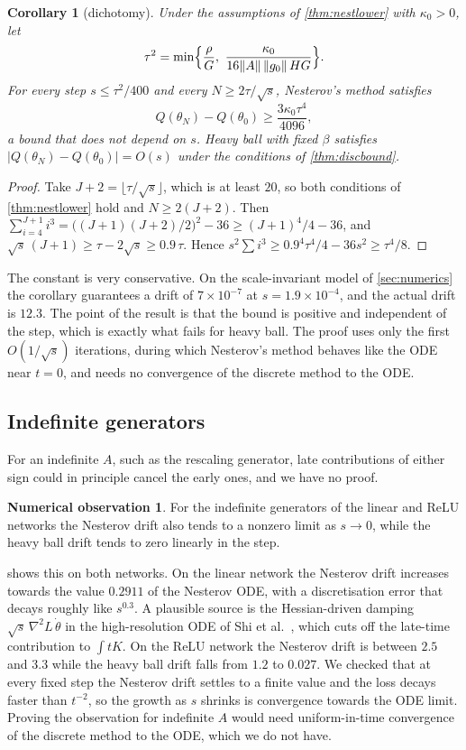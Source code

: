 \documentclass[11pt]{article}
\newtheorem{corollary}[theorem]{Corollary}
\theoremstyle{remark}
\theoremstyle{definition}
\newtheorem{observation}[theorem]{Numerical observation}
\begin{document}
\begin{corollary}[dichotomy]\label{cor:dichotomy}
Under the assumptions of \cref{thm:nestlower} with $\kappa_0>0$, let
\[
\tau^2=\min\Bigl\{\frac\rho G,\ \frac{\kappa_0}{16\|A\|\,\|g_0\|\,HG}\Bigr\}.
\]
For every step $s\le\tau^2/400$ and every $N\ge2\tau/\sqrt s$, Nesterov's method satisfies
\[
Q(\theta_N)-Q(\theta_0)\ge\frac{3\kappa_0\tau^4}{4096},
\]
a bound that does not depend on $s$. Heavy ball with fixed $\beta$ satisfies $|Q(\theta_N)-Q(\theta_0)|=O(s)$ under the conditions of \cref{thm:discbound}.
\end{corollary}

\begin{proof}
Take $J+2=\lfloor\tau/\sqrt s\rfloor$, which is at least $20$, so both conditions of \cref{thm:nestlower} hold and $N\ge2(J+2)$. Then $\sum_{i=4}^{J+1}i^3=\bigl((J+1)(J+2)/2\bigr)^2-36\ge(J+1)^4/4-36$, and $\sqrt s\,(J+1)\ge\tau-2\sqrt s\ge0.9\,\tau$. Hence $s^2\sum i^3\ge0.9^4\tau^4/4-36s^2\ge\tau^4/8$.
\end{proof}

The constant is very conservative. On the scale-invariant model of \cref{sec:numerics} the corollary guarantees a drift of $7\times10^{-7}$ at $s=1.9\times10^{-4}$, and the actual drift is $12.3$. The point of the result is that the bound is positive and independent of the step, which is exactly what fails for heavy ball. The proof uses only the first $O(1/\sqrt s)$ iterations, during which Nesterov's method behaves like the ODE near $t=0$, and needs no convergence of the discrete method to the ODE.

\subsection{Indefinite generators}

For an indefinite $A$, such as the rescaling generator, late contributions of either sign could in principle cancel the early ones, and we have no proof.

\begin{observation}\label{obs:dichotomy}
For the indefinite generators of the linear and ReLU networks the Nesterov drift also tends to a nonzero limit as $s\to0$, while the heavy ball drift tends to zero linearly in the step.
\end{observation}

 shows this on both networks. On the linear network the Nesterov drift increases towards the value $0.2911$ of the Nesterov ODE, with a discretisation error that decays roughly like $s^{0.3}$. A plausible source is the Hessian-driven damping $\sqrt s\,\nabla^2L\,\dot\theta$ in the high-resolution ODE of Shi et al.~\cite{shi2022}, which cuts off the late-time contribution to $\int tK$. On the ReLU network the Nesterov drift is between $2.5$ and $3.3$ while the heavy ball drift falls from $1.2$ to $0.027$. We checked that at every fixed step the Nesterov drift settles to a finite value and the loss decays faster than $t^{-2}$, so the growth as $s$ shrinks is convergence towards the ODE limit. Proving the observation for indefinite $A$ would need uniform-in-time convergence of the discrete method to the ODE, which we do not have.
\end{document}
